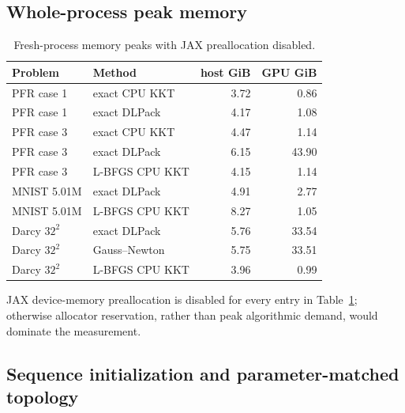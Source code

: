 \subsection{Whole-process peak memory}

\begin{table}[H]
\centering
\caption{Fresh-process memory peaks with JAX preallocation disabled.}
\label{tab:memory}
\small
\begin{tabular}{llrr}
\toprule
Problem & Method & host GiB & GPU GiB\\
\midrule
PFR case 1 & exact CPU KKT & 3.72 & 0.86\\
PFR case 1 & exact DLPack & 4.17 & 1.08\\
PFR case 3 & exact CPU KKT & 4.47 & 1.14\\
PFR case 3 & exact DLPack & 6.15 & 43.90\\
PFR case 3 & L-BFGS CPU KKT & 4.15 & 1.14\\
MNIST 5.01M & exact DLPack & 4.91 & 2.77\\
MNIST 5.01M & L-BFGS CPU KKT & 8.27 & 1.05\\
Darcy $32^2$ & exact DLPack & 5.76 & 33.54\\
Darcy $32^2$ & Gauss--Newton & 5.75 & 33.51\\
Darcy $32^2$ & L-BFGS CPU KKT & 3.96 & 0.99\\
\bottomrule
\end{tabular}
\end{table}

JAX device-memory preallocation is disabled for every entry in
Table~\ref{tab:memory}; otherwise allocator reservation, rather than peak
algorithmic demand, would dominate the measurement.

\subsection{Sequence initialization and parameter-matched topology}

